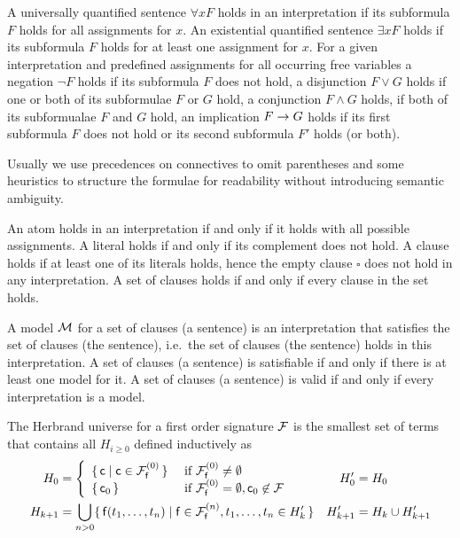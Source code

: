 \begin{definition}\label{def:semantics:FOF}
	A universally quantified sentence $\forall x F$
	holds in an interpretation if its subformula $F$ holds for all assignments for $x$.
	An existential quantified sentence $\exists xF$ holds if its subformula $F$ holds for at least one assignment for $x$.
	For a given interpretation and predefined assignments for all occurring free variables
	a negation $\lnot F$ holds if its subformula $F$ does not hold,
	a disjunction $F\lor G$ holds if one or both of its subformulae $F$ or $G$ hold,
	a conjunction $F\land G$ holds, if both of its subformualae $F$ and $G$ hold,
	an implication $F\rightarrow G$ holds if its first subformula $F$ does not hold or its second subformula $F'$ holds (or both).
	\begin{remark}Usually we use precedences on connectives to omit parentheses
		and some heuristics to structure the formulae for readability
		without introducing semantic ambiguity.
	\end{remark}
\end{definition}

\begin{definition}\label{def:semantics:CNF}
	An atom holds in an interpretation if and only if it
	holds with all possible assignments.
	A literal holds if and only if its complement does not hold.
	A clause holds if at least one of its literals holds,
	hence the empty clause $\square$ does not hold in any interpretation.
	A set of clauses holds if and only if every clause in the set holds.
\end{definition}

\begin{definition}
	A {\myem model} ${\mathcal M}$ for a set of clauses (a sentence) is an interpretation that
	{\myem satisfies} the set of clauses (the sentence),
	i.e.~the set of clauses (the sentence) holds in this interpretation.
	A set of clauses (a sentence) is {\myem satisfiable} if and only if there is at least one model for it.
	A set of clauses (a sentence) is {\myem valid} if and only if every interpretation is a model.
\end{definition}

\begin{definition}\label{def:hk}
	The {\myem Herbrand universe} for a first order signature ${\mathcal F}$
	is the smallest set of terms that contains all $H_{i\geq 0}$ defined inductively as
	\begin{align*}
	H_0 &= \left\{
	\begin{array}{ll}
	\{\,\mc \mid \mc\in\mcFfn[0]\,\} 
	&\text{if } \mcFfn[0]\not=\emptyset\\
	\{\,\mc_0\,\}
	&\text{if } \mcFfn[0]=\emptyset, \mc_0\not\in\mcF
	\end{array}
	\right.
	&
	H'_0 &= H_0
	\\
	H_{k+1} &= \bigcup_{n> 0}
	\{\,
	\mf(t_1,\ldots,t_n) \mid
	\mf\in\mcFfn[n],
	t_1,\ldots,t_n \in H_k'
	\,\}
	&
	H'_{k+1} &= H_k \cup H'_{k+1}
	\end{align*}

\end{definition}

